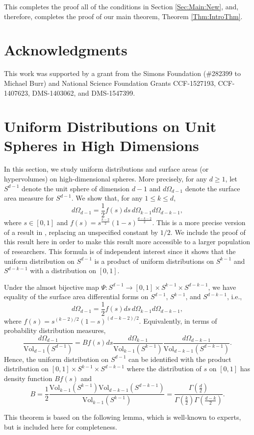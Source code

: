 \documentclass[twoside,11pt]{article}
\newcommand{\VV}[2]{\text{Vol}_{#2}\left( #1 \right)}
\begin{document}
This completes the proof all of the conditions in Section \ref{Sec:Main:New}, and, therefore, completes the proof of our main theorem, Theorem \ref{Thm:IntroThm}.


\section*{Acknowledgments}

This work was supported by a grant from the Simons Foundation (\#282399 to Michael Burr) and National Science Foundation Grants CCF-1527193,  CCF-1407623, DMS-1403062, and  DMS-1547399.

\appendix	

\section{Uniform Distributions on Unit Spheres in High Dimensions}

In this section,   we study uniform distributions  and surface areas (or hypervolumes) on high-dimensional spheres.   
More precisely,  for any $d\geq 1$, let $S^{d-1}$ denote the unit sphere of dimension $d-1$
and $d\Omega_{d-1}$ denote the surface area measure for $S^{d-1}$. We show that, for any $1\leq k \leq d$, 
  \[ d\Omega_{d-1} = \frac{1}{2} f(s)ds\, d\Omega_{k-1} d\Omega_{d-k-1},\]
where $s \in [0,1]$ and   $f(s) =  s^{\frac{k-2}{2}}(1-s)^{\frac{d-k-2}{2}}$.  
This is a more precise version of a result in \cite{KaneNelsonMeka}, replacing an unspecified constant by $1/2$.  We include the proof of this result here in order to make this result more accessible to a larger population of researchers.
This formula  is of independent interest since it shows that the uniform distribution on $S^{d-1}$ is a product of uniform distributions on $S^{k-1}$ and $S^{d-k-1}$ with a distribution on $[0,1]$.

\begin{theorem} \label{Thm_ud}
Under the almost bijective map $\Psi: S^{d-1}   \rightarrow    [0,1] \times S^{k-1} \times S^{d-k-1}$, we have equality of the surface area differential forms on $S^{d-1}$, $S^{k-1}$, and $S^{d-k-1}$, i.e.,
  \[ d\Omega_{d-1} = \frac{1}{2} f(s)ds\, d\Omega_{k-1} d\Omega_{d-k-1},\]
   where $f(s)=s^{(k-2)/2}(1-s)^{(d-k-2)/2}$.
Equivalently,  in terms of probability distribution measures,
 \[  \frac{d\Omega_{d-1}}{\VV{S^{d-1}}{d-1}} =  B f(s) ds \frac{d\Omega_{k-1}}{\VV{S^{k-1}}{k-1}} \frac{d\Omega_{d-k-1}}{\VV{S^{d-k-1}}{d-k-1}}.\]
Hence, the uniform distribution on $S^{d-1}$ can be identified with the product distribution on $[0,1] \times S^{k-1} \times S^{d-k-1}$ where the distribution of $s$ on $ [0,1]$ has density function $Bf(s)$ and 
 \begin{equation} \label{Eqn:B}
 		 B = \frac{1}{2} \frac{\VV{S^{k-1}}{k-1}  \VV{S^{d-k-1}}{d-k-1}}{\VV{S^{k-1}}{k-1}} = 
  \frac{\Gamma(\frac{d}{2})}{\Gamma(\frac{k}{2}) \Gamma(\frac{d-k}{2})}.
  \end{equation}
 \end{theorem}
 This theorem is based on the following lemma, which is well-known to experts, but is included here for completeness.
 
\end{document}
